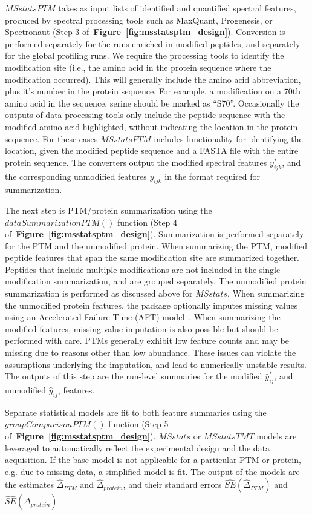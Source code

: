 \documentclass[mcp]{article}
\numberwithin{table}{section}
\def\figref#1{{\bf Figure~\ref{fig:#1}}}
\begin{document}
$MSstatsPTM$ takes as input lists of identified and quantified spectral features, produced by spectral processing tools such as MaxQuant, Progenesis, or Spectronaut (Step 3 of~\figref{msstatsptm_design}). Conversion is performed separately for the runs enriched in modified peptides, and separately for the global profiling runs. We require the processing tools to identify the modification site (i.e., the amino acid in the protein sequence where the modification occurred). This will generally include the amino acid abbreviation, plus it's number in the protein sequence. For example, a modification on a 70th amino acid in the sequence, serine should be marked as ``S70''. Occasionally the outputs of data processing tools only include the peptide sequence with the modified amino acid highlighted, without indicating the location in the protein sequence. For these cases $MSstatsPTM$ includes functionality for identifying the location, given the modified peptide sequence and a FASTA file with the entire protein sequence. The converters output the modified spectral features $y_{ijk}^{\ast}$, and the corresponding unmodified features $y_{ijk}$ in the format required for summarization.

The next step is PTM/protein summarization using the $dataSummarizationPTM()$ function (Step 4 of~\figref{msstatsptm_design}). Summarization is performed separately for the PTM and the unmodified protein. When summarizing the PTM, modified peptide features that span the same modification site are summarized together. Peptides that include multiple modifications are not included in the single modification summarization, and are grouped separately. The unmodified protein summarization is performed as discussed above for $MSstats$. When summarizing the unmodified protein features, the package optionally imputes missing values using an Accelerated Failure Time (AFT) model~\cite{Wei:1992}. When summarizing the modified features, missing value imputation is also possible but should be performed with care. PTMs generally exhibit low feature counts and may be missing due to reasons other than low abundance. These issues can violate the assumptions underlying the imputation, and lead to numerically unstable results. The outputs of this step are the run-level summaries for the modified $\hat{y}_{ij}^{\ast}$, and unmodified $\hat{y}_{ij}$, features.

Separate statistical models are fit to both feature summaries using the $groupComparisonPTM()$ function (Step 5 of~\figref{msstatsptm_design}). $MSstats$ or $MSstatsTMT$ models are leveraged to automatically reflect the experimental design and the data acquisition. If the base model is not applicable for a particular PTM or protein, e.g. due to missing data, a simplified model is fit. The output of the models are the estimates $\hat{\Delta}_{PTM}$ and $\hat{\Delta}_{protein}$, and their standard errors $\widehat{SE}(\hat{\Delta}_{PTM})$ and $\widehat{SE}(\hat{\Delta}_{protein})$. 
\end{document}
